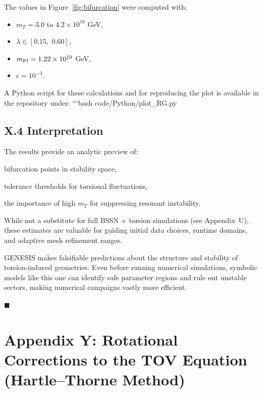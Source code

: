 \documentclass{article}
\begin{document}
The values in Figure~\ref{fig:bifurcation} were computed with:
\begin{itemize}
  \item $m_T = 3.0$ to $4.2 \times 10^{18}$ GeV,
  \item $\lambda \in [0.15,\;0.60]$,
  \item $m_{\rm Pl} = 1.22 \times 10^{19}$ GeV,
  \item $\epsilon = 10^{-3}$.
\end{itemize}

A Python script for these calculations and for reproducing the plot is available in the repository under:
```bash
code/Python/plot_RG.py
\subsection*{X.4 Interpretation}

The results provide an analytic preview of:

    bifurcation points in stability space,

    tolerance thresholds for torsional fluctuations,

    the importance of high $m_T$ for suppressing resonant instability.

While not a substitute for full BSSN + torsion simulations (see Appendix~U), these estimates are valuable for guiding initial data choices, runtime domains, and adaptive mesh refinement ranges.

\begin{tcolorbox}[colback=gray!5, colframe=black!30, title=Why this matters]
GENESIS makes falsifiable predictions about the structure and stability of torsion-induced geometries. Even before running numerical simulations, symbolic models like this one can identify safe parameter regions and rule out unstable sectors, making numerical campaigns vastly more efficient.
\end{tcolorbox}

\hfill$\blacksquare$


\section*{Appendix Y: Rotational Corrections to the TOV Equation (Hartle--Thorne Method)}

\label{app:hartle-thorne}
\end{document}
